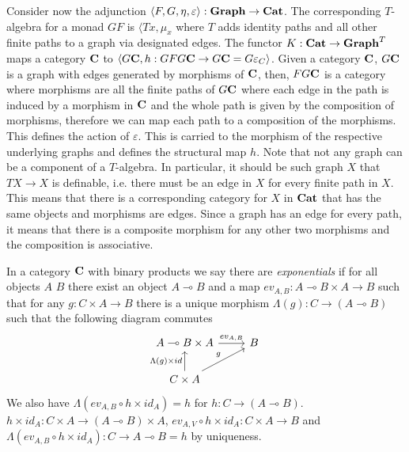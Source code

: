 \documentclass[acmsmall,screen, nonacm, anonymous]{acmart}
\begin{document}
\begin{example}

Consider now the adjunction $\langle F, G, \eta, \varepsilon \rangle : \mathbf{Graph} \to \mathbf{Cat}$.
The corresponding $T$-algebra for a monad $GF$ is $\langle Tx, \mu_{x}$ where $T$ adds identity paths and all other finite paths to a graph via designated edges.
The functor $K : \mathbf{Cat} \to \mathbf{Graph}^{T}$ maps a category $\mathbf{C}$ to $\langle G\mathbf{C}, h : GFG\mathbf{C} \to G\mathbf{C} = G\varepsilon_{C}\rangle$.
Given a category $\mathbf{C}$, $G\mathbf{C}$ is a graph with edges generated by morphisms of $\mathbf{C}$, then, $FG\mathbf{C}$ is a category where morphisms are all the finite paths of $G\mathbf{C}$ where each edge in the path is induced by a morphism in $\mathbf{C}$ and the whole path is given by the composition of morphisms, therefore we can map each path to a composition of the morphisms.
This defines the action of $\varepsilon$.
This is carried to the morphism of the respective underlying graphs and defines the structural map $h$.
Note that not any graph can be a component of a $T$-algebra.
In particular, it should be such graph $X$ that $TX \to X$ is definable, i.e. there must be an edge in $X$ for every finite path in $X$.
This means that there is a corresponding category for $X$ in $\mathbf{Cat}$ that has the same objects and morphisms are edges.
Since a graph has an edge for every path, it means that there is a composite morphism for any other two morphisms and the composition is associative.
\end{example}


\begin{definition}[Exponentials]
    In a category $\mathbf{C}$ with binary products we say there are \textit{exponentials} if for all objects $A$ $B$ there exist an object $A \multimap B$ and a map $ev_{A,B} : A \multimap B \times A \to B$ such that for any $g : C \times A \to B$ there is a unique morphism $\Lambda(g) : C \to (A \multimap B)$ such that the following diagram commutes
    \[
    \begin{tikzcd}
        A \multimap B \times A \arrow[r, "{ev_{A,B}}"]               & B \\
        C \times A \arrow[u, "\Lambda(g) \times id"] \arrow[ru, "g"] &  
    \end{tikzcd}
    \]
    We also have $\Lambda(ev_{A,B} \circ h \times id_{A}) = h$ for $h : C \to (A \multimap B)$.
    $h \times id_{A} : C \times A \to (A \multimap B) \times A$, $ev_{A,V} \circ h \times id_{A} : C \times A \to B$ and $\Lambda(ev_{A,B} \circ h \times id_{A}) : C \to A \multimap B = h$ by uniqueness.
\end{definition}
\end{document}
